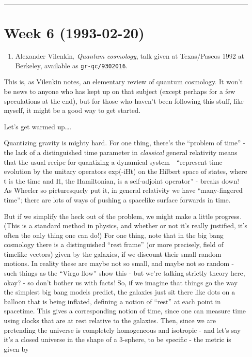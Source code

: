 \documentclass{article}
\def\tightlist{}
\begin{document}
\begin{center}\rule{0.5\linewidth}{0.5pt}\end{center}
\hypertarget{week-6-1993-02-20}{%
\section{Week 6 (1993-02-20)}\label{week-6-1993-02-20}}

\begin{enumerate}
\def\labelenumi{\arabic{enumi})}
\tightlist
\item
  Alexander Vilenkin, \emph{Quantum cosmology}, talk given at
  Texas/Pascos 1992 at Berkeley, available as
  \href{http://xxx.lanl.gov/abs/gr-qc/9302016}{\texttt{gr-qc/9302016}}.
\end{enumerate}

This is, as Vilenkin notes, an elementary review of quantum cosmology.
It won't be news to anyone who has kept up on that subject (except
perhaps for a few speculations at the end), but for those who haven't
been following this stuff, like myself, it might be a good way to get
started.

Let's get warmed up\ldots.

Quantizing gravity is mighty hard. For one thing, there's the ``problem
of time'' - the lack of a distinguished time parameter in
\emph{classical} general relativity means that the usual recipe for
quantizing a dynamical system - ``represent time evolution by the
unitary operators exp(-iHt) on the Hilbert space of states, where t is
the time and H, the Hamiltonian, is a self-adjoint operator'' - breaks
down! As Wheeler so picturesquely put it, in general relativity we have
``many-fingered time''; there are lots of ways of pushing a spacelike
surface forwards in time.

But if we simplify the heck out of the problem, we might make a little
progress. (This is a standard method in physics, and whether or not it's
really justified, it's often the only thing one can do!) For one thing,
note that in the big bang cosmology there is a distinguished ``rest
frame'' (or more precisely, field of timelike vectors) given by the
galaxies, if we discount their small random motions. In reality these
are maybe not so small, and maybe not so random - such things as the
``Virgo flow'' show this - but we're talking strictly theory here, okay?
- so don't bother us with facts! So, if we imagine that things go the
way the simplest big bang models predict, the galaxies just sit there
like dots on a balloon that is being inflated, defining a notion of
``rest'' at each point in spacetime. This gives a corresponding notion
of time, since one can measure time using clocks that are at rest
relative to the galaxies. Then, since we are pretending the universe is
completely homogeneous and isotropic - and let's say it's a closed
universe in the shape of a 3-sphere, to be specific - the metric is
given by
\end{document}
